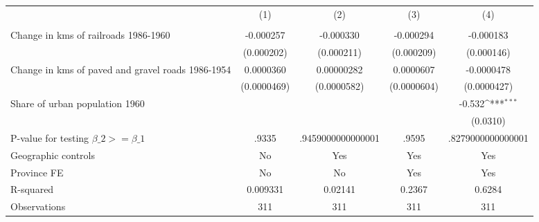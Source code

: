 {
\def\sym#1{\ifmmode^{#1}\else\(^{#1}\)\fi}
\begin{tabular}{l*{4}{c}}
\hline\hline
                &\multicolumn{1}{c}{(1)}&\multicolumn{1}{c}{(2)}&\multicolumn{1}{c}{(3)}&\multicolumn{1}{c}{(4)}\\
                &\multicolumn{1}{c}{}&\multicolumn{1}{c}{}&\multicolumn{1}{c}{}&\multicolumn{1}{c}{}\\
\hline
Change in kms of railroads 1986-1960&-0.000257         &-0.000330         &-0.000294         &-0.000183         \\
                &(0.000202)         &(0.000211)         &(0.000209)         &(0.000146)         \\
[1em]
Change in kms of paved and gravel roads 1986-1954&0.0000360         &0.00000282         &0.0000607         &-0.0000478         \\
                &(0.0000469)         &(0.0000582)         &(0.0000604)         &(0.0000427)         \\
[1em]
Share of urban population 1960&                  &                  &                  &   -0.532\sym{***}\\
                &                  &                  &                  & (0.0310)         \\
\hline
P-value for testing $\beta\_{2} >= \beta\_{1}$&    .9335         &.9459000000000001         &    .9595         &.8279000000000001         \\
Geographic controls&       No         &      Yes         &      Yes         &      Yes         \\
Province FE     &       No         &       No         &      Yes         &      Yes         \\
R-squared       & 0.009331         &  0.02141         &   0.2367         &   0.6284         \\
Observations    &      311         &      311         &      311         &      311         \\
\hline\hline
\end{tabular}
}
